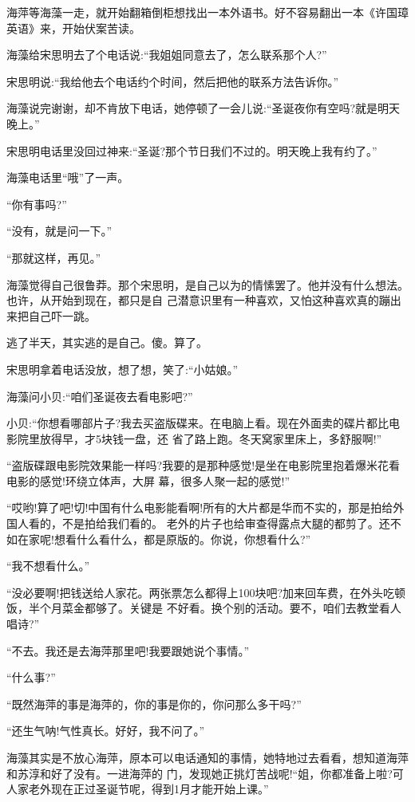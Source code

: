 \documentclass[11pt,a4paper,onecolumn]{article}
\begin{document}
海萍等海藻一走，就开始翻箱倒柜想找出一本外语书。好不容易翻出一本《许国璋英语》来，开始伏案苦读。

海藻给宋思明去了个电话说:``我姐姐同意去了，怎么联系那个人?''

宋思明说:``我给他去个电话约个时间，然后把他的联系方法告诉你。''

海藻说完谢谢，却不肯放下电话，她停顿了一会儿说:``圣诞夜你有空吗?就是明天晚上。''

宋思明电话里没回过神来:``圣诞?那个节日我们不过的。明天晚上我有约了。''

海藻电话里``哦''了一声。

``你有事吗?''

``没有，就是问一下。''

``那就这样，再见。''

海藻觉得自己很鲁莽。那个宋思明，是自己以为的情愫罢了。他并没有什么想法。也许，从开始到现在，都只是自
己潜意识里有一种喜欢，又怕这种喜欢真的蹦出来把自己吓一跳。

逃了半天，其实逃的是自己。傻。算了。

宋思明拿着电话没放，想了想，笑了:``小姑娘。''

海藻问小贝:``咱们圣诞夜去看电影吧?''

小贝:``你想看哪部片子?我去买盗版碟来。在电脑上看。现在外面卖的碟片都比电影院里放得早，才5块钱一盘，还
省了路上跑。冬天窝家里床上，多舒服啊!''

``盗版碟跟电影院效果能一样吗?我要的是那种感觉!是坐在电影院里抱着爆米花看电影的感觉!环绕立体声，大屏
幕，很多人聚一起的感觉!''

``哎哟!算了吧!切!中国有什么电影能看啊!所有的大片都是华而不实的，那是拍给外国人看的，不是拍给我们看的。
老外的片子也给审查得露点大腿的都剪了。还不如在家呢!想看什么看什么，都是原版的。你说，你想看什么?''

``我不想看什么。''

``没必要啊!把钱送给人家花。两张票怎么都得上100块吧?加来回车费，在外头吃顿饭，半个月菜金都够了。关键是
不好看。换个别的活动。要不，咱们去教堂看人唱诗?''

``不去。我还是去海萍那里吧!我要跟她说个事情。''

``什么事?''

``既然海萍的事是海萍的，你的事是你的，你问那么多干吗?''

``还生气呐!气性真长。好好，我不问了。''

海藻其实是不放心海萍，原本可以电话通知的事情，她特地过去看看，想知道海萍和苏淳和好了没有。一进海萍的
门，发现她正挑灯苦战呢!``姐，你都准备上啦?可人家老外现在正过圣诞节呢，得到1月才能开始上课。''
\end{document}
